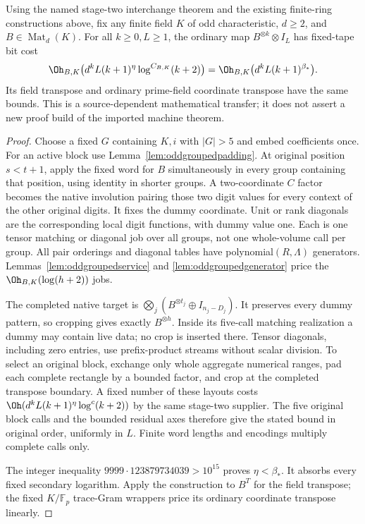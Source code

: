 \begin{papertheorem}
\label{thm:oddgroupedkernel}
Using the named stage-two interchange theorem and the existing finite-ring
constructions above, fix any finite field $K$ of odd characteristic,
$d\ge2$, and $B\in\operatorname{Mat}_d(K)$. For all $k\ge0,L\ge1$,
the ordinary map $B^{\otimes k}\otimes I_L$ has fixed-tape bit cost
\[
 \Oh_{B,K}\bigl(d^kL(k+1)^\eta\log^{C_{B,K}}(k+2)\bigr)
   =\Oh_{B,K}\bigl(d^kL(k+1)^{\beta_*}\bigr).
\]
Its field transpose and ordinary prime-field coordinate transpose have
the same bounds. This is a source-dependent mathematical transfer;
it does not assert a new proof build of the imported machine theorem.
\end{papertheorem}
\begin{proof}
Choose a fixed $G$ containing $K,i$ with $|G|>5$ and embed coefficients
once. For an active block use Lemma~\ref{lem:oddgroupedpadding}.
At original position $s<t+1$, apply the fixed word for $B$ simultaneously
in every group containing that position, using identity in shorter groups.
A two-coordinate $C$ factor becomes the native involution pairing those
two digit values for every context of the other original digits. It fixes
the dummy coordinate. Unit or rank diagonals are the corresponding local
digit functions, with dummy value one. Each is one tensor matching or
diagonal job over all groups, not one whole-volume call per group.
All pair orderings and diagonal tables have polynomial$(R,\Lambda)$
generators. Lemmas~\ref{lem:oddgroupedservice} and
\ref{lem:oddgroupedgenerator} price the $\Oh_{B,K}(\log(h+2))$ jobs.

The completed native target is
$\bigotimes_j(B^{\otimes t_j}\oplus I_{n_j-D_j})$.
It preserves every dummy pattern, so cropping gives exactly
$B^{\otimes h}$. Inside its five-call matching realization a dummy
may contain live data; no crop is inserted there. Tensor diagonals,
including zero entries, use prefix-product streams without scalar
division. To select an original block, exchange only whole aggregate
numerical ranges, pad each complete rectangle by a bounded factor, and
crop at the completed transpose boundary. A fixed number of these layouts
costs $\Oh(d^kL(k+1)^\eta\log^c(k+2))$ by the same stage-two supplier.
The five original block calls and the bounded residual axes therefore
give the stated bound in original order, uniformly in $L$.
Finite word lengths and encodings multiply complete calls only.

The integer inequality
$9999\cdot123879734039>10^{15}$ proves $\eta<\beta_*$.
It absorbs every fixed secondary logarithm. Apply the construction to
$B^T$ for the field transpose; the fixed $K/\mathbb F_p$ trace-Gram
wrappers price its ordinary coordinate transpose linearly.
\end{proof}

